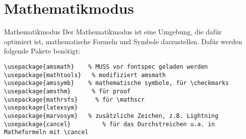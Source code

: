 \section{Mathematikmodus}

\begin{frame}[fragile]{Mathematikmodus}
Der Mathematikmodus ist eine Umgebung, die dafür optimiert ist, mathematische Formeln und Symbole darzustellen. Dafür werden folgende Pakete benötigt:
\begin{lstlisting}[style=tex, mathescape]
\usepackage{amsmath}    % MUSS vor fontspec geladen werden
\usepackage{mathtools}   % modifiziert amsmath
\usepackage{amssymb}    % mathematische symbole, für \checkmarks
\usepackage{amsthm}      % für proof
\usepackage{mathrsfs}     % für \mathscr
\usepackage{latexsym}
\usepackage{marvosym}   % zusätzliche Zeichen, z.B. Lightning
\usepackage{cancel}         % für das Durchstreichen u.a. in Matheformeln mit \cancel
\end{lstlisting}
\end{frame}



